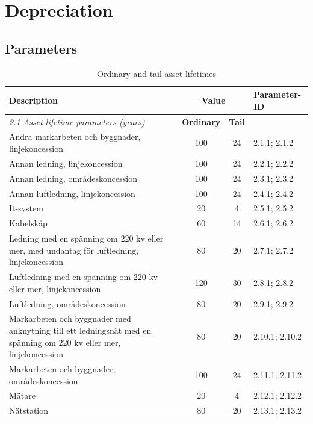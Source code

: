 \section{Depreciation}

\subsection{Parameters}

\begin{table}[H]
\centering
\footnotesize
\begin{threeparttable}
\caption{Ordinary and tail asset lifetimes}
\label{tab:asset-lifetimes}
\begin{tabular}{@{}p{7cm}ccl@{}}
\toprule
\textbf{Description} & \multicolumn{2}{c}{\textbf{Value}} & \textbf{Parameter-ID} \\
\midrule
\textit{2.1 Asset lifetime parameters (years)} & \textbf{Ordinary}\tnote{a} & \textbf{Tail}\tnote{b} & \\
Andra markarbeten och byggnader, linjekoncession & 100 & 24 & 2.1.1; 2.1.2 \\
Annan ledning, linjekoncession & 100 & 24 & 2.2.1; 2.2.2 \\
Annan ledning, områdeskoncession & 100 & 24 & 2.3.1; 2.3.2 \\
Annan luftledning, linjekoncession & 100 & 24 & 2.4.1; 2.4.2 \\
It-system & 20 & 4 & 2.5.1; 2.5.2 \\
Kabelskåp & 60 & 14 & 2.6.1; 2.6.2 \\
Ledning med en spänning om 220 kv eller mer, med undantag för luftledning, linjekoncession & 80 & 20 & 2.7.1; 2.7.2 \\
Luftledning med en spänning om 220 kv eller mer, linjekoncession & 120 & 30 & 2.8.1; 2.8.2 \\
Luftledning, områdeskoncession & 80 & 20 & 2.9.1; 2.9.2 \\
Markarbeten och byggnader med anknytning till ett ledningsnät med en spänning om 220 kv eller mer, linjekoncession & 80 & 20 & 2.10.1; 2.10.2 \\
Markarbeten och byggnader, områdeskoncession & 100 & 24 & 2.11.1; 2.11.2 \\
Mätare & 20 & 4 & 2.12.1; 2.12.2 \\
Nätstation & 80 & 20 & 2.13.1; 2.13.2 \\

\end{tabular}
\end{threeparttable}
\end{table}
